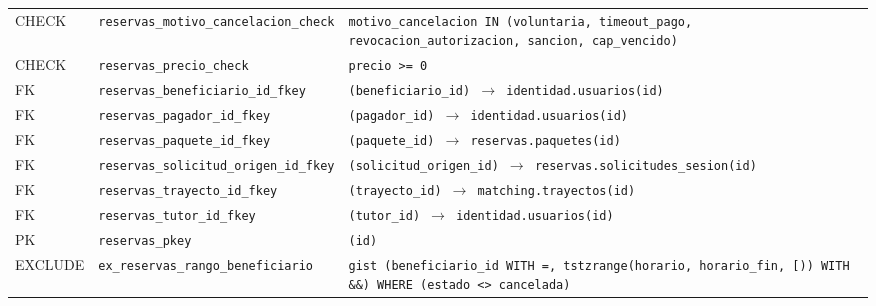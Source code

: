 {\begin{xltabular}{\textwidth}{@{}>{\raggedright\arraybackslash}p{1.7cm} >{\raggedright\arraybackslash}p{4.6cm} L@{}}
    CHECK & \texttt{reservas\_\allowbreak{}motivo\_\allowbreak{}cancelacion\_\allowbreak{}check} & \texttt{motivo\_\allowbreak{}cancelacion IN (\allowbreak{}\textquotesingle{}voluntaria\textquotesingle{},\allowbreak{} \textquotesingle{}timeout\_\allowbreak{}pago\textquotesingle{},\allowbreak{} \textquotesingle{}revocacion\_\allowbreak{}autorizacion\textquotesingle{},\allowbreak{} \textquotesingle{}sancion\textquotesingle{},\allowbreak{} \textquotesingle{}cap\_\allowbreak{}vencido\textquotesingle{})} \\
    CHECK & \texttt{reservas\_\allowbreak{}precio\_\allowbreak{}check} & \texttt{precio \textgreater{}= 0} \\
    FK & \texttt{reservas\_\allowbreak{}beneficiario\_\allowbreak{}id\_\allowbreak{}fkey} & \texttt{(\allowbreak{}beneficiario\_\allowbreak{}id) $\rightarrow$ identidad.usuarios(\allowbreak{}id)} \\
    FK & \texttt{reservas\_\allowbreak{}pagador\_\allowbreak{}id\_\allowbreak{}fkey} & \texttt{(\allowbreak{}pagador\_\allowbreak{}id) $\rightarrow$ identidad.usuarios(\allowbreak{}id)} \\
    FK & \texttt{reservas\_\allowbreak{}paquete\_\allowbreak{}id\_\allowbreak{}fkey} & \texttt{(\allowbreak{}paquete\_\allowbreak{}id) $\rightarrow$ reservas.paquetes(\allowbreak{}id)} \\
    FK & \texttt{reservas\_\allowbreak{}solicitud\_\allowbreak{}origen\_\allowbreak{}id\_\allowbreak{}fkey} & \texttt{(\allowbreak{}solicitud\_\allowbreak{}origen\_\allowbreak{}id) $\rightarrow$ reservas.solicitudes\_\allowbreak{}sesion(\allowbreak{}id)} \\
    FK & \texttt{reservas\_\allowbreak{}trayecto\_\allowbreak{}id\_\allowbreak{}fkey} & \texttt{(\allowbreak{}trayecto\_\allowbreak{}id) $\rightarrow$ matching.trayectos(\allowbreak{}id)} \\
    FK & \texttt{reservas\_\allowbreak{}tutor\_\allowbreak{}id\_\allowbreak{}fkey} & \texttt{(\allowbreak{}tutor\_\allowbreak{}id) $\rightarrow$ identidad.usuarios(\allowbreak{}id)} \\
    PK & \texttt{reservas\_\allowbreak{}pkey} & \texttt{(\allowbreak{}id)} \\
    EXCLUDE & \texttt{ex\_\allowbreak{}reservas\_\allowbreak{}rango\_\allowbreak{}beneficiario} & \texttt{gist (\allowbreak{}beneficiario\_\allowbreak{}id WITH =,\allowbreak{} tstzrange(\allowbreak{}horario,\allowbreak{} horario\_\allowbreak{}fin,\allowbreak{} \textquotesingle{}[)\textquotesingle{}) WITH \&\&) WHERE (\allowbreak{}estado \textless{}\textgreater{} \textquotesingle{}cancelada\textquotesingle{})} \\

\end{xltabular}}
